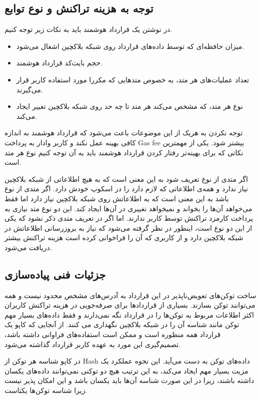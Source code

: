\subsection{توجه به هزینه تراکنش و نوع توابع}
در نوشتن یک قرارداد هوشمند باید به نکات زیر توجه کنیم.
\begin{itemize}
  \item
میزان حافظه‌ای که توسط داده‌های قرارداد روی شبکه بلاکچین اشغال می‌شود.
  \item
حجم بایت‌کد قرارداد هوشمند.
  \item
تعداد عملیات‌های هر متد، به خصوص متدهایی که مکررا مورد استفاده کاربر قرار می‌گیرند.
  \item
نوع هر متد، که مشخص می‌کند هر متد تا چه حد روی شبکه بلاکچین تغییر ایجاد می‌کند.
\end{itemize}

توجه نکردن به هریک از این موضوعات باعث می‌شود که قرارداد هوشمند به اندازه کافی بهینه عمل نکند و کاربر وادار به پرداخت
\gls{Gas fee}
بیشتر شود.
یکی از مهمترین نکاتی که برای بهینه‌تر رفتار کردن قرارداد هوشمند
باید به آن توجه کنیم نوع هر متد است.

اگر متدی از نوع
تعریف شود به این معنی است که به هیچ اطلاعاتی از شبکه بلاکچین نیاز ندارد
و همه‌ی اطلاعاتی که لازم دارد را در اسکوپ
خودش دارد. اگر متدی از نوع
باشد به این معنی است که به اطلاعاتش روی شبکه بلاکچین نیاز دارد
اما فقط می‌خواهد آن‌ها را بخواند و نمیخواهد تغییری در آن‌ها ایجاد کند.
این دو نوع متد نیازی به پرداخت کارمزد تراکنش توسط کاربر ندارند.
اما اگر در تعریف متدی ذکر نشود که یکی از این دو نوع است، اینطور در نظر گرفته می‌شود
که نیاز به بروزرسانی اطلاعاتش در شبکه بلاکچین دارد
و از کاربری که آن را فراخوانی کرده است هزینه تراکنش بیشتر دریافت می‌شود.


\subsection{جزئیات فنی پیاده‌سازی}
ساخت توکن‌های تعویض‌ناپذیر در این قرارداد به آدرس‌های مشخص محدود نیست و همه می‌توانند توکن بسازند.
بسیاری از قراردادها برای صرفه‌جویی در هزینه تراکنش کاربران اکثر اطلاعات مربوط به توکن‌ها را در قرارداد نگه نمی‌دارند
و فقط داده‌های بسیار مهم توکن مانند شناسه آن را در شبکه بلاکچین نگهداری می کنند.
از آنجایی که کاپو یک قرارداد همه منظوره است و ممکن است استفاده‌های فراوانی داشته باشد،
تصمیم‌گیری این مورد به عهده کاربر قرارداد گذاشته می‌شود.

در کاپو شناسه هر توکن از
\gls{Hash}
داده‌های توکن به دست می‌آید.
این نحوه عملکرد یک مزیت بسیار مهم ایجاد می‌کند،
به این ترتیب هیچ دو توکنی نمی‌توانند داده‌های یکسان داشته باشند،
زیرا در این صورت شناسه آن‌ها باید یکسان باشد و این امکان پذیر نیست زیرا شناسه توکن‌ها یکتاست.


